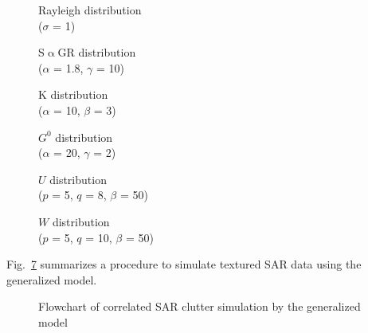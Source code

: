 \documentclass[journal]{IEEEtran}
\begin{document}
\begin{figure*}[hbt]
\centering
\begin{subfigure}[t]{4 cm}
	\centering
	\caption{Rayleigh distribution \\($\sigma$ = 1)}\label{Figure6(a)}
\end{subfigure}
\qquad
\begin{subfigure}[t]{4 cm}
	\centering
	\caption{S$\upalpha$GR distribution \\($\alpha$ = 1.8, $\gamma$ = 10)}\label{Figure6(b)}
\end{subfigure}
\qquad
\begin{subfigure}[t]{4 cm}
	\centering
	\caption{K distribution \\($\alpha$ = 10, $\beta$ = 3)}\label{Figure6(c)}
\end{subfigure}
\qquad
\begin{subfigure}[t]{4 cm}
	\centering
	\caption{$G^0$ distribution \\($\alpha$ = 20, $\gamma$ = 2)}\label{Figure6(d)}
\end{subfigure}
\qquad
\begin{subfigure}[t]{4 cm}
	\centering
	\caption{$U$ distribution \\($p$ = 5, $q$ = 8, $\beta$ = 50)}\label{Figure6(e)}
\end{subfigure}
\qquad
\begin{subfigure}[t]{4 cm}
	\centering
	\caption{$W$ distribution \\($p$ = 5, $q$ = 10, $\beta$ = 50)}\label{Figure6(f)}
\end{subfigure}
\caption{Simulated correlated SAR images using the Gaussian kernel in Eq. \eqref{eq43} with the generalized model}\label{Figure6}
\end{figure*}

Fig.~\ref{Figure7} summarizes a procedure to simulate textured SAR data using the generalized model.

\begin{figure}[hbt]
\centering
\caption{Flowchart of correlated SAR clutter simulation by the generalized model}\label{Figure7}
\end{figure}
\end{document}
